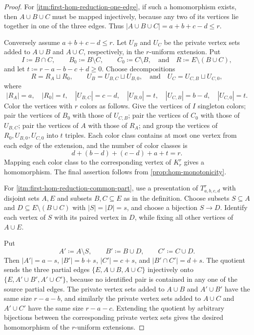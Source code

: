 \documentclass[10pt,a4paper]{article}
\theoremstyle{plain}
\theoremstyle{definition}
\theoremstyle{plain}
\begin{document}
\begin{proof}
For \ref{itm:first-hom-reduction-one-edge}, if such a homomorphism exists, then $A\cup B\cup C$ must be mapped injectively, because any two of its vertices lie together in one of the three edges.  Thus $|A\cup B\cup C|=a+b+c-d\le r$.

Conversely assume $a+b+c-d\le r$.  Let $U_B$ and $U_C$ be the private vertex sets added to $A\cup B$ and $A\cup C$, respectively, in the $r$-uniform extension.  Put
\[
        I\coloneqq B\cap C,\qquad
        B_0\coloneqq B\setminus C,\qquad
        C_0\coloneqq C\setminus B,\quad\text{and}\quad
        R\coloneqq E\setminus(B\cup C),
\]
and let $t\coloneqq r-a-b-c+d\ge0$.  Choose decompositions
\[
        R=R_A\sqcup R_0,\qquad
        U_B=U_{B,C}\sqcup U_{B,0},\quad\text{and}\quad
        U_C=U_{C,B}\sqcup U_{C,0},
\]
where
\[
        |R_A|=a,\quad |R_0|=t,\quad
        |U_{B,C}|=c-d,\quad |U_{B,0}|=t,\quad
        |U_{C,B}|=b-d,\quad |U_{C,0}|=t.
\]
Color the vertices with $r$ colors as follows.  Give the vertices of $I$ singleton colors; pair the vertices of $B_0$ with those of $U_{C,B}$; pair the vertices of $C_0$ with those of $U_{B,C}$; pair the vertices of $A$ with those of $R_A$; and group the vertices of $R_0,U_{B,0},U_{C,0}$ into $t$ triples.  Each color class contains at most one vertex from each edge of the extension, and the number of color classes is
\[
        d+(b-d)+(c-d)+a+t=r.
\]
Mapping each color class to the corresponding vertex of $K^r_r$ gives a homomorphism.  The final assertion follows from \cref{prop:hom-monotonicity}.

For \ref{itm:first-hom-reduction-common-part}, use a presentation of $T^r_{a,b,c,d}$ with disjoint sets $A,E$ and subsets $B,C\subseteq E$ as in the definition.  Choose subsets $S\subseteq A$ and $D\subseteq E\setminus(B\cup C)$ with $|S|=|D|=s$, and choose a bijection $S\to D$.  Identify each vertex of $S$ with its paired vertex in $D$, while fixing all other vertices of $A\cup E$.

Put
\[
        A'\coloneqq A\setminus S,\qquad
        B'\coloneqq B\cup D,\qquad
        C'\coloneqq C\cup D.
\]
Then $|A'|=a-s$, $|B'|=b+s$, $|C'|=c+s$, and $|B'\cap C'|=d+s$.  The quotient sends the three partial edges $\{E, A\cup B, A\cup C\}$ injectively onto $\{E, A'\cup B', A'\cup C'\}$, because no identified pair is contained in any one of the source partial edges.
The private vertex sets added to $A\cup B$ and $A'\cup B'$ have the same size $r-a-b$, and similarly the private vertex sets added to $A\cup C$ and $A'\cup C'$ have the same size $r-a-c$.  Extending the quotient by arbitrary bijections between the corresponding private vertex sets gives the desired homomorphism of the $r$-uniform extensions.


\end{proof}
\end{document}

